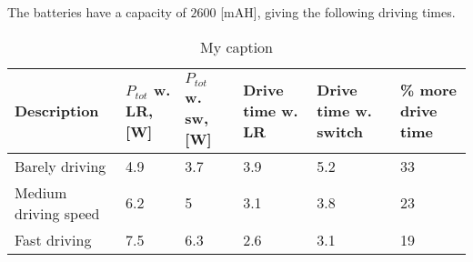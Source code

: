 \documentclass[11pt]{article}
\begin{document}
The batteries have a capacity of $2600$ [mAH], giving the following driving times.


\begin{table}[H]
\centering
\caption{My caption}
\label{my-label}
\begin{tabular}{|l|l|p{2cm}|p{2cm}|p{2cm}|p{2cm}|}
\hline
\textbf{Description} & $P_{tot}$ w. LR, {[}W{]} & $P_{tot}$ w. sw, {[}W{]} & Drive time w. LR & Drive time w.  switch& \% more drive time \\ \hline
Barely driving       & 4.9                         & 3.7                               & 3.9              & 5.2                      & 33                 \\ \hline
Medium driving speed & 6.2                         & 5                                 & 3.1              & 3.8                      & 23                 \\ \hline
Fast driving         & 7.5                         & 6.3                               & 2.6              & 3.1                      & 19                 \\ \hline
\end{tabular}
\end{table}



\end{document}
